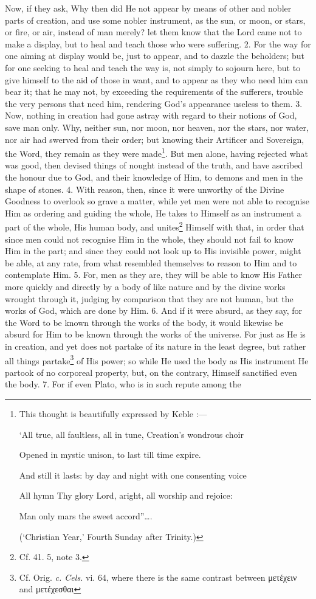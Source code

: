 Now, if they ask, Why then did He not appear by means of other and nobler parts of creation, and use some nobler instrument, as the sun, or moon, or stars, or fire, or air, instead of man merely? let them know that the Lord came not to make a display, but to heal and teach those who were suffering. 2. For the way for one aiming at display would be, just to appear, and to dazzle the beholders; but for one seeking to heal and teach the way is, not simply to sojourn here, but to give himself to the aid of those in want, and to appear as they who need him can bear it; that he may not, by exceeding the requirements of the sufferers, trouble the very persons that need him, rendering God’s appearance useless to them. 3. Now, nothing in creation had gone astray with regard to their notions of God, save man only. Why, neither sun, nor moon, nor heaven, nor the stars, nor water, nor air had swerved from their order; but knowing their Artificer and Sovereign, the Word, they remain as they were made\footnote{This thought is beautifully expressed by Keble :— \par ‘All true, all faultless, all in tune, Creation’s wondrous choir \par Opened in mystic unison, to last till time expire. \par And still it lasts: by day and night with one consenting voice \par All hymn Thy glory Lord, aright, all worship and rejoice: \par Man only mars the sweet accord”…. \par (‘Christian Year,’ Fourth Sunday after Trinity.)}. But men alone, having rejected what was good, then devised things of nought instead of the truth, and have ascribed the honour due to God, and their knowledge of Him, to demons and men in the shape of stones. 4. With reason, then, since it were unworthy of the Divine Goodness to overlook so grave a matter, while yet men were not able to recognise Him as ordering and guiding the whole, He takes to Himself as an instrument a part of the whole, His human body, and unites\footnote{Cf. 41. 5, note 3.} Himself with that, in order that since men could not recognise Him in the whole, they should not fail to know Him in the part; and since they could not look up to His invisible power, might be able, at any rate, from what resembled themselves to reason to Him and to contemplate Him. 5. For, men as they are, they will be able to know His Father more quickly and directly by a body of like nature and by the divine works wrought through it, judging by comparison that they are not human, but the works of God, which are done by Him. 6. And if it were absurd, as they say, for the Word to be known through the works of the body, it would likewise be absurd for Him to be known through the works of the universe. For just as He is in creation, and yet does not partake of its nature in the least degree, but rather all things partake\footnote{Cf. Orig. \emph{c. Cels.} vi. 64, where there is the same contrast between \textgreek{μετέχειν} and \textgreek{μετέχεσθαι}} of His power; so while He used the body as His instrument He partook of no corporeal property, but, on the contrary, Himself sanctified even the body. 7. For if even Plato, who is in such repute among the 